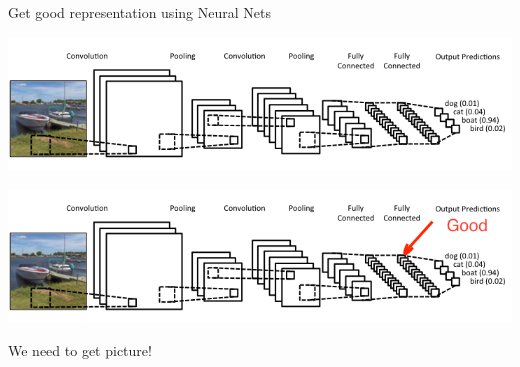 \documentclass{beamer}
\begin{document}
\begin{frame}{Get good representation using Neural Nets}
	\begin{center}
	   	\includegraphics[scale=0.4]{img/cnn}
		
	   	\includegraphics[scale=0.4]{img/cnn_gr}
	\end{center}
	 
	\begin{tcolorbox}[colback=gray!2, colframe=red!90, title=Problem]
		  \centering We need to get picture!
	\end{tcolorbox}
\end{frame}
\end{document}
